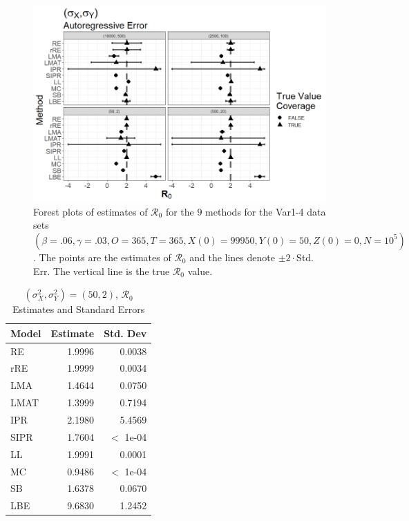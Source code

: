 \documentclass[12pt]{article}
\newcommand{\xxsir}{\ensuremath{9} } %
\newcommand{\rr}{\ensuremath{\mathcal{R}_0}}
\begin{document}
\begin{figure}[H]
	\begin{center}
		\includegraphics[scale=0.5]{images/var_ar.tiff}
		\caption{Forest plots of estimates of $\rr$ for the \xxsir methods for the Var1-4 data sets $(\beta=.06, \gamma=.03, O=365, T=365, X(0)=99950, Y(0)=50, Z(0)=0, N=10^5)$.  The points are the estimates of $\rr$ and the lines denote $\pm 2\cdot $Std. Err.  The vertical line is the true $\rr$ value.}
	\end{center}
\end{figure}

\begin{table}[H]
	
	
	\centering
	\begin{tabular}[t]{l|r|r}
		\hline
		Model & Estimate & Std. Dev\\
		\hline
		RE & 1.9996 & 0.0038\\
		\hline
		rRE & 1.9999 & 0.0034\\
		\hline
		LMA & 1.4644 & 0.0750\\
		\hline
		LMAT & 1.3999 & 0.7194\\
		\hline
		IPR & 2.1980 & 5.4569\\
		\hline
		SIPR & 1.7604 & $<$ 1e-04\\
		\hline
		LL & 1.9991 & 0.0001\\
		\hline
		MC & 0.9486 & $<$ 1e-04\\
		\hline
		SB & 1.6378 & 0.0670\\
		\hline
		LBE & 9.6830 & 1.2452\\
		\hline
	\end{tabular}
	\caption{ $(\sigma^2_X, \sigma^2_Y) = (50, 2)$, $\rr$ Estimates and Standard Errors}
\end{table}
\end{document}
